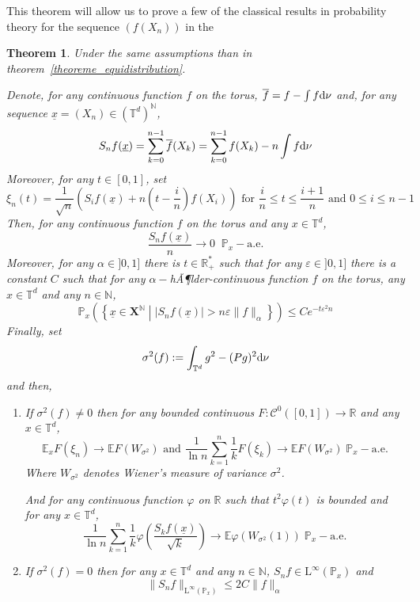 \documentclass[11pt]{amsart}
\newtheorem{theorem}{Theorem}[section]
\theoremstyle{definition}
\theoremstyle{remark}
\numberwithin{equation}{section}
\begin{document}
This theorem will allow us to prove a few of the classical results in probability theory for the sequence $(f(X_n))$ in the
\begin{theorem}\label{theoreme_proba}
Under the same assumptions than in theorem~\ref{theoreme_equidistribution}.

Denote, for any continuous function $f$ on the torus, $\overline f= f-\int f{{\rm d}}\nu$ and, for any sequence $\underline{x}=(X_n) \in ({\mathbb T}^d)^{\mathbb N}$,
\[
S_n f(\underline{x}) = \sum_{k=0}^{n-1}\overline{f}(X_k) = \sum_{k=0}^{n-1} f(X_k) - n \int f{{\rm d}}\nu
\]
Moreover, for any $t\in [0,1]$, set
\[
\xi_n(t) = \frac 1 {\sqrt {n}} \left(S_if(\underline{x})+ n\left(t-\frac i n\right)f(X_{i})\right) \text{ for }\frac i n \leqslant t\leqslant\frac{i+1} n \text{ and }0 \leqslant i \leqslant n-1
\]
Then, for any continuous function $f$ on the torus and any $x\in {\mathbb T}^d$,
\[
\frac {S_n f(\underline{x})} n \xrightarrow\, 0 \;\;{\mathbb P}_x-\text{a.e.}
\]
Moreover, for any $\alpha\in]0,1]$ there is $t\in {\mathbb R}_+^\ast$ such that for any $\varepsilon\in ]0,1]$ there is a constant $C$ such that for any $\alpha-$hÃ¶lder-continuous function $f$ on the torus, any $x\in {\mathbb T}^d$ and any $n\in {\mathbb N}$,
\[
{\mathbb P}_x \left( \left\{ \underline{x} \in {\mathbf X}^{\mathbb N}\middle|  \left|S_n f(\underline{x})\right|  >n\varepsilon \|f\|_\alpha \right\}\right) \leqslant Ce^{-t \varepsilon^2 n}
\]
Finally, set
\[
\sigma^2(f) := \int_{{\mathbb T}^d} g^2 - (Pg)^2 {{\rm d}}\nu
\]
and then,
\begin{enumerate}
\item\label{item:TCLPSF}If $\sigma^2(f) \not=0$ then for any bounded continuous $F: \mathcal C^0([0,1]) \to {\mathbb R}$ and any $x\in{\mathbb T}^d$,
\[
{\mathbb E}_x F(\xi_n) \xrightarrow\, {\mathbb E} F(W_{\sigma^2}) \text{ and }\frac 1 {\ln n } \sum_{k=1}^n \frac 1 k F(\xi_k) \xrightarrow\, {\mathbb E} F(W_{\sigma^2}) \; {\mathbb P}_x- \text{a.e.}
\]
Where $W_{\sigma^2}$ denotes Wiener's measure of variance $\sigma^2$.

And for any continuous function $\varphi$ on ${\mathbb R}$ such that $t^2 \varphi(t)$ is bounded and for any $x\in {\mathbb T}^d$,
\[
\frac 1 {\ln n } \sum_{k=1}^n \frac 1 k \varphi\left(\frac{ S_k f(\underline{x})}{\sqrt k}\right)\xrightarrow\, {\mathbb E} \varphi(W_{\sigma^2}(1)) \;  {\mathbb P}_x- \text{a.e.}
\]
\item\label{item:variance_zero} If $\sigma^2(f)= 0$ then for any $x\in {\mathbb T}^d$ and any $n\in {\mathbb N}$, $S_nf \in \mathrm{L}^\infty({\mathbb P}_x)$ and
\[
 \|S_nf\|_{\mathrm{L}^\infty({\mathbb P}_x)} \leqslant 2C\|f\|_\alpha
\]
\end{enumerate}
\end{theorem}
\end{document}
